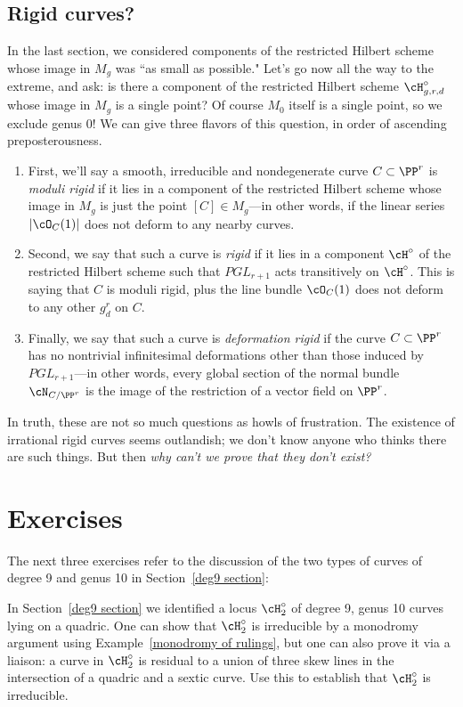 \subsection{Rigid curves?}

In the last section, we considered components of the restricted Hilbert scheme whose image in $M_g$ was ``as small as possible." Let's go now all the way to the extreme, and ask: is there a component of the restricted Hilbert scheme $\cH^\circ_{g,r,d}$ whose image in $M_g$ is a single point? Of course $M_0$ itself is a single point, so we exclude genus 0! We can give three flavors of this question, in order of ascending preposterousness.

\begin{enumerate} 
\item First, we'll say a smooth, irreducible and nondegenerate curve $C \subset \PP^r$ is \emph{moduli rigid} if it lies in a component of the restricted Hilbert scheme whose image in $M_g$ is just the point $[C] \in M_g$---in other words, if the linear series $|\cO_C(1)|$ does not deform to any nearby curves.

\item Second, we say that such a curve is \emph{rigid} if it lies in a component $\cH^\circ$ of the restricted Hilbert scheme such that $PGL_{r+1}$ acts transitively on $\cH^\circ$. This is saying that $C$ is moduli rigid, plus the line bundle $\cO_C(1)$ does not deform to any other $g^r_d$ on $C$.

\item Finally, we say that such a curve is \emph{deformation rigid} if the curve $C \subset \PP^r$ has no nontrivial infinitesimal deformations other than those induced by $PGL_{r+1}$---in other words, every global section of the normal bundle $\cN_{C/\PP^r}$ is the image of the restriction of a vector field on $\PP^r$.
\end{enumerate}

In truth, these are not so much questions as howls of frustration. The existence of irrational rigid curves seems outlandish; we don't know anyone who thinks there are such things. But then \emph{why can't we prove that they don't exist?} 


\section{Exercises}
 The next three exercises refer to the discussion of the two types of curves of degree 9 and genus 10 in Section~\ref{deg9 section}:
\begin{exercise}\label{degree 9 type 2 is irreducible}
In Section~\ref{deg9 section} we identified a locus $\cH^\circ_2$ of degree 9, genus 10 curves lying on a quadric.
One can show that $\cH^\circ_2$  is irreducible by a monodromy argument using Example~\ref{monodromy of rulings}, but one can also prove it via a liaison:  a curve in $\cH^\circ_2$ is residual to a union of three skew lines in the intersection of a quadric and a sextic curve. Use this to establish that $\cH^\circ_2$ is irreducible.
\end{exercise}

